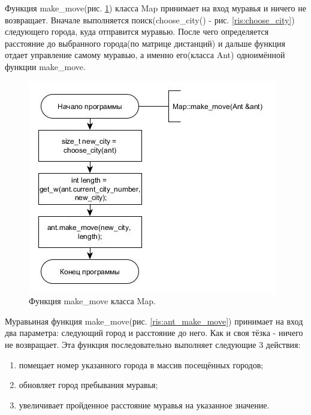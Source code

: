 \documentclass[a4paper, 14pt]{article}
\begin{document}
Функция make\_move(рис. \ref{ris:map_make_move}) класса Map принимает на вход муравья и ничего не возвращает. Вначале выполняется поиск(choose\_city() - рис. \ref{ris:choose_city}) следующего города, куда отправится муравью. После чего определяется расстояние до выбранного города(по матрице дистанций) и дальше функция отдает управление самому муравью, а именно его(класса Ant) одноимённой функции make\_move.

\begin{figure}[h!]
\center
\includegraphics[scale=0.8]{map_make_move.jpg}
\caption{Функция make\_move класса Map.}
\label{ris:map_make_move}
\end{figure}\newpage

Муравьиная функция make\_move(рис. \ref{ris:ant_make_move}) принимает на вход два параметра: следующий город и расстояние до него. Как и своя тёзка - ничего не возвращает. Эта функция последовательно выполняет следующие 3 действия: 

\begin{enumerate}
	\item[1)] помещает номер указанного города в массив посещённых городов;
    \item[2)] обновляет город пребывания муравья;
    \item[3)] увеличивает пройденное расстояние муравья на указанное значение.
\end{enumerate}
\end{document}
